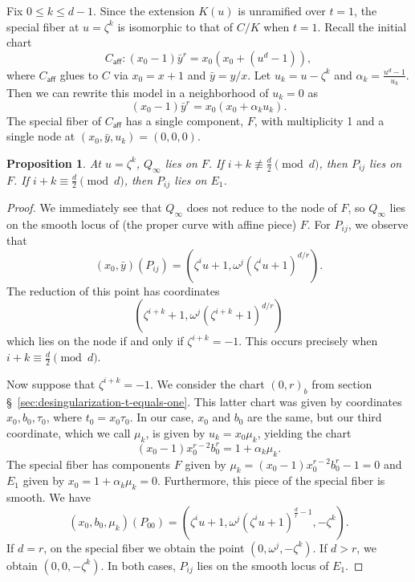 \documentclass[reqno]{amsart}
\newtheorem{proposition}[thm]{Proposition}
\theoremstyle{definition}
\theoremstyle{remark}
\def\caff{C_{\textsf{aff}}}
\begin{document}
Fix $0 \leq k \leq d-1$. Since the extension $K(u)$ is unramified over $t = 1$, the special fiber at $u = \zeta^k$ is isomorphic to that of $C/K$ when $t = 1$. Recall the initial chart 
\[
\caff: (x_0 - 1) \bar{y}^r = x_0(x_0 + (u^d - 1)),
\]
where $\caff$ glues to $C$ via $x_0 = x + 1$ and $\bar{y} = y/x$. Let $u_k = u - \zeta^k$ and $\alpha_k = \frac{u^d - 1}{u_k}$. Then we can rewrite this model in a neighborhood of $u_k = 0$ as
\[
(x_0 - 1) \bar{y}^r = x_0(x_0 + \alpha_ku_k).
\]
The special fiber of $\caff$ has a single component, $F$, with multiplicity 1 and a single node at $(x_0, \bar{y}, u_k) = (0,0,0)$.
\begin{proposition}\label{prop:points-on-components-u-zeta-k}
  At $u=\zeta^k$, $Q_\infty$ lies on $F$. If $i+k \not\equiv \frac{d}{2} \pmod{d}$, then $P_{ij}$ lies on $F$. If $i + k \equiv \frac{d}{2} \pmod{d}$, then $P_{ij}$ lies on $E_1$.
\end{proposition}

\begin{proof}
  We immediately see that $Q_\infty$ does not reduce to the node of $F$, so $Q_\infty$ lies on the smooth locus of (the proper curve with affine piece) $F$. For $P_{ij}$, we observe that
  \[
  (x_0, \bar{y})(P_{ij}) = (\zeta^i u + 1, \omega^j (\zeta^i u + 1)^{d/r}).
  \]
  The reduction of this point has coordinates
  \begin{equation}
    (\zeta^{i+k} + 1, \omega^j(\zeta^{i+k} + 1)^{d/r})\label{eq:pij-on-u-equals-zeta-k}
  \end{equation}
    which lies on the node if and only if $\zeta^{i+k} = -1$. This occurs precisely when $i + k \equiv \frac{d}{2} \pmod{d}$.

  Now suppose that $\zeta^{i+k} = -1$. We consider the chart $(0,r)_b$ from section \S~\ref{sec:desingularization-t-equals-one}. This latter chart was given by coordinates $x_0, b_0, \tau_0$, where $t_0 = x_0 \tau_0$. In our case, $x_0$ and $b_0$ are the same, but our third coordinate, which we call $\mu_k$, is given by $u_k = x_0 \mu_k$, yielding the chart
  \[
  (x_0 - 1)x_0^{r-2}b_0^r = 1 + \alpha_k \mu_k.
  \]
  The special fiber has components $F$ given by $\mu_k = (x_0 - 1)x_0^{r-2}b_0^r - 1 = 0$ and $E_1$ given by $x_0 = 1 + \alpha_k \mu_k = 0$. Furthermore, this piece of the special fiber is smooth. We have
  \[
  (x_0, b_0, \mu_k)(P_{00}) = (\zeta^iu + 1, \omega^j(\zeta^i u + 1)^{\frac{d}{r} - 1}, -\zeta^k).
  \]
  If $d = r$, on the special fiber we obtain the point $(0, \omega^j, -\zeta^k)$. If $d > r$, we obtain $(0, 0, -\zeta^k)$. In both cases, $P_{ij}$ lies on the smooth locus of $E_1$.
\end{proof}
\end{document}
